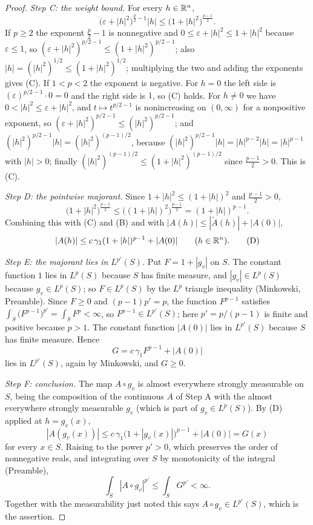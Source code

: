 \begin{proof}
\emph{Step C: the weight bound.}  For every $h\in\mathbb{R}^n$,
\[
\bigl(\varepsilon+|h|^2\bigr)^{\frac p2-1}|h|\le\bigl(1+|h|^2\bigr)^{\frac{p-1}2} .
\tag{C}
\]
If $p\ge2$ the exponent $\frac p2-1$ is nonnegative and
$0\le\varepsilon+|h|^2\le1+|h|^2$ because $\varepsilon\le1$, so
$(\varepsilon+|h|^2)^{p/2-1}\le(1+|h|^2)^{p/2-1}$; also
$|h|=(|h|^2)^{1/2}\le(1+|h|^2)^{1/2}$; multiplying the two and adding the
exponents gives (C).  If $1<p<2$ the exponent is negative.  For $h=0$ the left
side is $(\varepsilon)^{p/2-1}\cdot0=0$ and the right side is $1$, so (C) holds.
For $h\ne0$ we have $0<|h|^2\le\varepsilon+|h|^2$, and $t\mapsto t^{p/2-1}$ is
nonincreasing on $(0,\infty)$ for a nonpositive exponent, so
$(\varepsilon+|h|^2)^{p/2-1}\le(|h|^2)^{p/2-1}$; and
$(|h|^2)^{p/2-1}|h|=(|h|^2)^{(p-1)/2}$, because
$(|h|^2)^{p/2-1}|h|=|h|^{p-2}|h|=|h|^{p-1}$ with $|h|>0$; finally
$(|h|^2)^{(p-1)/2}\le(1+|h|^2)^{(p-1)/2}$ since $\frac{p-1}2>0$.  This is (C).

\emph{Step D: the pointwise majorant.}  Since $1+|h|^2\le(1+|h|)^2$ and
$\frac{p-1}2>0$,
\[
\bigl(1+|h|^2\bigr)^{\frac{p-1}2}\le\bigl((1+|h|)^2\bigr)^{\frac{p-1}2}
=(1+|h|)^{p-1} .
\]
Combining this with (C) and (B) and with
$|A(h)|\le|\widetilde A(h)|+|A(0)|$,
\[
|A(h)|\le c\,\gamma_1(1+|h|)^{p-1}+|A(0)|\qquad(h\in\mathbb{R}^n).
\tag{D}
\]

\emph{Step E: the majorant lies in $L^{p'}(S)$.}  Put
$F=1+|g_v|$ on $S$.  The constant function $1$ lies in $L^p(S)$ because $S$ has
finite measure, and $|g_v|\in L^p(S)$ because $g_v\in L^p(S)$; so $F\in L^p(S)$
by the $L^p$ triangle inequality (Minkowski, Preamble).  Since $F\ge0$ and
$(p-1)p'=p$, the function $F^{p-1}$ satisfies
$\int_S\bigl(F^{p-1}\bigr)^{p'}=\int_SF^{p}<\infty$, so $F^{p-1}\in L^{p'}(S)$;
here $p'=p/(p-1)$ is finite and positive because $p>1$.  The constant function
$|A(0)|$ lies in $L^{p'}(S)$ because $S$ has finite measure.  Hence
\[
G=c\,\gamma_1F^{p-1}+|A(0)|
\]
lies in $L^{p'}(S)$, again by Minkowski, and $G\ge0$.

\emph{Step F: conclusion.}  The map $A\circ g_v$ is almost everywhere strongly
measurable on $S$, being the composition of the continuous $A$ of Step A with
the almost everywhere strongly measurable $g_v$ (which is part of
$g_v\in L^p(S)$).  By (D) applied at $h=g_v(x)$,
\[
|A(g_v(x))|\le c\,\gamma_1\bigl(1+|g_v(x)|\bigr)^{p-1}+|A(0)|=G(x)
\]
for every $x\in S$.  Raising to the power $p'>0$, which preserves the order of
nonnegative reals, and integrating over $S$ by monotonicity of the integral
(Preamble),
\[
\int_S|A\circ g_v|^{p'}\le\int_SG^{p'}<\infty .
\]
Together with the measurability just noted this says $A\circ g_v\in L^{p'}(S)$,
which is the assertion.
\end{proof}

